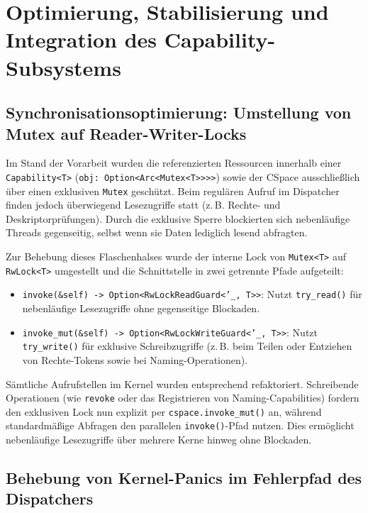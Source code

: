 \chapter{Optimierung, Stabilisierung und Integration des Capability-Subsystems}

\section{Synchronisationsoptimierung: Umstellung von Mutex auf Reader-Writer-Locks}

Im Stand der Vorarbeit wurden die referenzierten Ressourcen innerhalb einer \texttt{Capability<T>} (\texttt{obj: Option<Arc<Mutex<T>>>>}) sowie der CSpace ausschließlich über einen exklusiven \texttt{Mutex} geschützt. Beim regulären Aufruf im Dispatcher finden jedoch überwiegend Lesezugriffe statt (z.\,B. Rechte- und Deskriptorprüfungen). Durch die exklusive Sperre blockierten sich nebenläufige Threads gegenseitig, selbst wenn sie Daten lediglich lesend abfragten.

Zur Behebung dieses Flaschenhalses wurde der interne Lock von \texttt{Mutex<T>} auf \texttt{RwLock<T>} umgestellt und die Schnittstelle in zwei getrennte Pfade aufgeteilt:

\begin{itemize}
    \item \texttt{invoke(\&self) -> Option<RwLockReadGuard<'\_, T>>}: Nutzt \texttt{try\_read()} für nebenläufige Lesezugriffe ohne gegenseitige Blockaden.
    \item \texttt{invoke\_mut(\&self) -> Option<RwLockWriteGuard<'\_, T>>}: Nutzt \texttt{try\_write()} für exklusive Schreibzugriffe (z.\,B. beim Teilen oder Entziehen von Rechte-Tokens sowie bei Naming-Operationen).
\end{itemize}

Sämtliche Aufrufstellen im Kernel wurden entsprechend refaktoriert. Schreibende Operationen (wie \texttt{revoke} oder das Registrieren von Naming-Capabilities) fordern den exklusiven Lock nun explizit per \texttt{cspace.invoke\_mut()} an, während standardmäßige Abfragen den parallelen \texttt{invoke()}-Pfad nutzen. Dies ermöglicht nebenläufige Lesezugriffe über mehrere Kerne hinweg ohne Blockaden.


\section{Behebung von Kernel-Panics im Fehlerpfad des Dispatchers}

